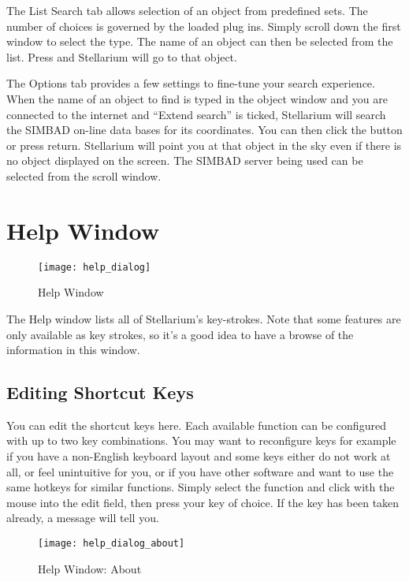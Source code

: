 The List Search tab allows selection of an object from predefined
sets.  The number of choices is governed by the loaded plug
ins. Simply scroll down the first window to select the type. The name
of an object can then be selected from the list. Press \key{\return} and
Stellarium will go to that object.


The Options tab provides a few settings to fine-tune your search experience.
When the name of an object to find is typed in the object
window and you are connected to the internet and ``Extend search'' is
ticked, Stellarium will search the SIMBAD on-line  data bases for its
coordinates. You can then click the  button or press return.
Stellarium will point you at that object in the sky even if there is no
object displayed on the screen. The SIMBAD server being used can be
selected from the scroll window.


\section{Help Window}
\label{sec:gui:help}

\begin{figure}[htbp]
\centering\texttt{[image: help\_dialog]}
\caption{Help Window}
\label{fig:gui:help}
\end{figure}

\noindent The Help window lists all of Stellarium's key-strokes. Note that some
features are only available as key strokes, so it's a good idea to have
a browse of the information in this window.

\subsection{Editing Shortcut Keys}
\label{sec:gui:help:hotkeys}

You can edit the shortcut keys here. Each available function can be
configured with up to two key combinations. You may want to
reconfigure keys for example if you have a non-English keyboard layout
and some keys either do not work at all, or feel unintuitive for you,
or if you have other software and want to use the same hotkeys for
similar functions. Simply select the function and click with the mouse
into the edit field, then press your key of choice. If the key has
been taken already, a message will tell you.


\begin{figure}[htbp]
\centering\texttt{[image: help\_dialog\_about]}
\caption{Help Window: About}
\label{fig:gui:help:about}
\end{figure}

